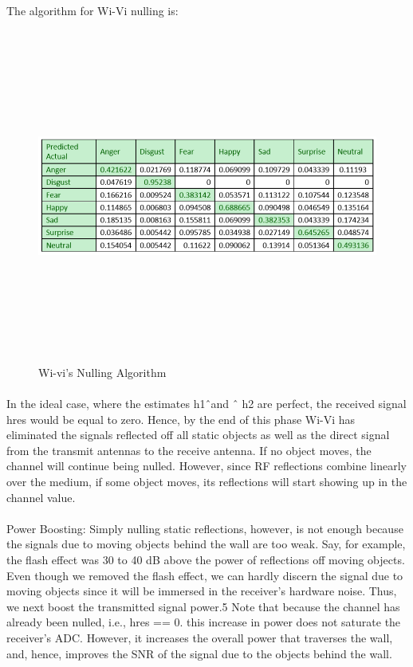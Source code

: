 \documentclass[a4paper,12pt,oneside]{article}
\begin{document}
The algorithm for Wi-Vi nulling is:
\begin{figure}[H]
\centering
\includegraphics[height=11cm,width=14cm]{9.png}
\caption{Wi-vi's Nulling Algorithm}
\end{figure}

\paragraph{}
In the ideal case, where the estimates h1ˆand ˆ h2 are perfect, the received signal hres
would be equal to zero. Hence, by the end of this phase Wi-Vi has eliminated the signals
reflected off all static objects as well as the direct signal from the transmit antennas to the receive
antenna. If no object moves, the channel will continue being nulled. However, since RF
reflections combine linearly over the medium, if some object moves, its reflections will start
showing up in the channel value.
\paragraph{}
Power Boosting: Simply nulling static reflections, however, is not enough because the signals
due to moving objects behind the wall are too weak. Say, for example, the flash effect was 30 to
40 dB above the power of reflections off moving objects. Even though we removed the flash
effect, we can hardly discern the signal due to moving objects since it will be immersed in the
receiver’s hardware noise. Thus, we next boost the transmitted signal power.5 Note that because
the channel has already been nulled, i.e., hres == 0. this increase in power does not saturate the
receiver’s ADC. However, it increases the overall power that traverses the wall, and, hence,
improves the SNR of the signal due to the objects behind the wall.
\end{document}
